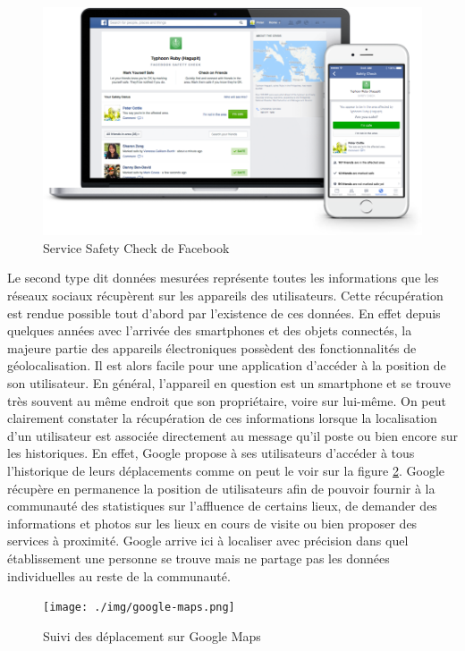 \begin{figure}[H]
    \centering
    \includegraphics{./img/safety-check.png}
    \caption{Service Safety Check de Facebook}
    \label{safety-check}
\end{figure}

Le second type dit données mesurées représente toutes les informations que les réseaux sociaux récupèrent sur les appareils des utilisateurs. Cette récupération est rendue possible tout d’abord par l’existence de ces données. En effet depuis quelques années avec l’arrivée des smartphones et des objets connectés, la majeure partie des appareils électroniques possèdent des fonctionnalités de géolocalisation. Il est alors facile pour une application d’accéder à la position de son utilisateur. En général, l’appareil en question est un smartphone et se trouve très souvent au même endroit que son propriétaire, voire sur lui-même. On peut clairement constater la récupération de ces informations lorsque la localisation d’un utilisateur est associée directement au message qu’il poste ou bien encore sur les historiques. En effet, Google propose à ses utilisateurs d’accéder à tous l’historique de leurs déplacements comme on peut le voir sur la figure \ref{google-maps}. Google récupère en permanence la position de utilisateurs afin de pouvoir fournir à la communauté des statistiques sur l’affluence de certains lieux, de demander des informations et photos sur les lieux en cours de visite ou bien proposer des services à proximité. Google arrive ici à localiser avec précision dans quel établissement une personne se trouve mais ne partage pas les données individuelles au reste de la communauté.

\begin{figure}[H]
    \centering
    \texttt{[image: ./img/google-maps.png]}
    \caption{Suivi des déplacement sur Google Maps}
    \label{google-maps}
\end{figure}

